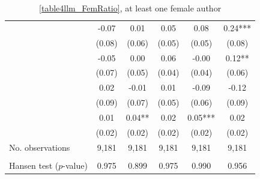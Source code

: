 \begin{table}
    \footnotesize
    \centering
    \begin{threeparttable}
        \caption{\autoref{table4llm_FemRatio}, at least one female author}
        \label{table4llm_Fem1}
        \begin{tabular}{p{3cm}S@{}S@{}S@{}S@{}S@{}}
            \toprule
            &{}&{}&{}&{}&{}\\
            \midrule
            &       -0.07   &        0.01   &        0.05   &        0.08   &        0.24***\\
                                          &      (0.08)   &      (0.06)   &      (0.05)   &      (0.05)   &      (0.08)   \\
            &       -0.05   &        0.00   &        0.06   &       -0.00   &        0.12** \\
                                          &      (0.07)   &      (0.05)   &      (0.04)   &      (0.04)   &      (0.06)   \\
            &        0.02   &       -0.01   &        0.01   &       -0.09   &       -0.12   \\
                                          &      (0.09)   &      (0.07)   &      (0.05)   &      (0.06)   &      (0.09)   \\
            &        0.01   &        0.04** &        0.02   &        0.05***&        0.02   \\
                                          &      (0.02)   &      (0.02)   &      (0.02)   &      (0.02)   &      (0.02)   \\
            \midrule
            No. observations      &       9,181   &       9,181   &       9,181   &       9,181   &       9,181   \\
             \\\quad Hansen test (\(p\)-value)&       0.975   &       0.899   &       0.975   &       0.990   &       0.956   \\

\end{tabular}
\end{threeparttable}
\end{table}
